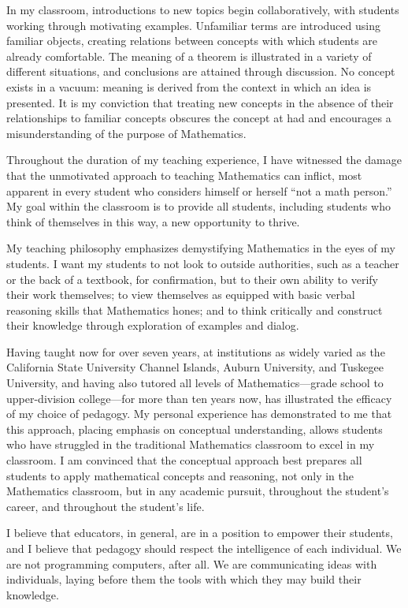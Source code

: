 \documentclass[11pt]{article}
\begin{document}
In my classroom, introductions to new topics begin collaboratively,
with students working through motivating examples. Unfamiliar terms are
introduced using familiar objects, creating relations between concepts
with which students are already comfortable. The meaning of a theorem is
illustrated in a variety of different situations, and conclusions are
attained through discussion. No concept exists in a vacuum:
meaning is derived from the context in which an idea is presented.
It is my conviction that treating new concepts in the absence of their
relationships to familiar concepts obscures the concept at had and
encourages a misunderstanding of the purpose of Mathematics.

Throughout the duration of my teaching experience, I have witnessed the
damage that the unmotivated approach to teaching Mathematics can
inflict, most apparent in every student who considers himself or herself
``not a math person.''
My goal within the classroom is to provide all students, including
students who think of themselves in this way, a new opportunity to
thrive.

My teaching philosophy emphasizes demystifying Mathematics in the eyes
of my students. I want my students to not look to outside authorities,
such as a teacher or the back of a textbook, for confirmation,
but to their own ability to verify their work themselves;
to view themselves as equipped with basic verbal reasoning skills that
Mathematics hones; and to think critically and construct their knowledge
through exploration of examples and dialog.

Having taught now for over seven years, at institutions as widely varied
as the California State University Channel Islands, Auburn University,
and Tuskegee University, and having also tutored all levels of
Mathematics---grade school to upper-division college---for more than ten
years now, has illustrated the efficacy of my choice of pedagogy.
My personal experience has demonstrated to me that this approach,
placing emphasis on conceptual understanding,
allows students who have struggled in the traditional Mathematics
classroom to excel in my classroom.
I am convinced that the conceptual approach best prepares all students
to apply mathematical concepts and reasoning, not only in the
Mathematics classroom, but in any academic pursuit, throughout the
student's career, and throughout the student's life.

I believe that educators, in general, are in a position to empower their
students, and I believe that pedagogy should respect the intelligence of
each individual. We are not programming computers, after all.
We are communicating ideas with individuals, laying before them the
tools with which they may build their knowledge.

\label{page:last}
\end{document}
